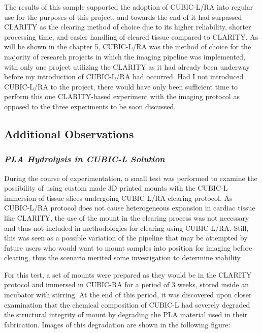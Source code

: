 The results of this sample supported the adoption of CUBIC-L/RA into regular use for the purposes of this project, and towards the end of it had surpassed CLARITY as the clearing method of choice due to its higher reliability, shorter processing time, and easier handling of cleared tissue compared to CLARITY. As will be shown in the chapter 5, CUBIC-L/RA was the method of choice for the majority of research projects in which the imaging pipeline was implemented, with only one project utilizing the CLARITY as it had already been underway before my introduction of CUBIC-L/RA had occurred. Had I not introduced CUBIC-L/RA to the project, there would have only been sufficient time to perform this one CLARITY-based experiment with the imaging protocol as opposed to the three experiments to be soon discussed. 


\subsection{Additional Observations}
\subsubsection{\textit{PLA Hydrolysis in CUBIC-L Solution}}

During the course of experimentation, a small test was performed to examine the possibility of using custom made 3D printed mounts with the CUBIC-L immersion of tissue slices undergoing CUBIC-L/RA clearing protocol. As CUBIC-L/RA protocol does not cause heterogeneous expansion in cardiac tissue like CLARITY, the use of the mount in the clearing process was not necessary and thus not included in methodologies for clearing using CUBIC-L/RA. Still, this was seen as a possible variation of the pipeline that may be attempted by future users who would want to mount samples into position for imaging before clearing, thus the scenario merited some investigation to determine viability. 

For this test, a set of mounts were prepared as they would be in the CLARITY protocol and immersed in CUBIC-RA for a period of 3 weeks, stored inside an incubator with stirring. At the end of this period, it was discovered upon closer examination that the chemical composition of CUBIC-L had severely degraded the structural integrity of mount by degrading the PLA material used in their fabrication. Images of this degradation are shown in the following figure:

